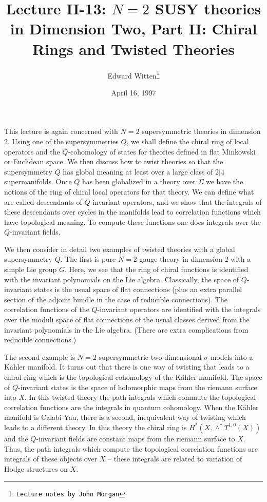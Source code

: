 \title{Lecture II-13:  $N=2$ SUSY theories in Dimension Two, Part II:
Chiral Rings and Twisted Theories} 

\author{Edward Witten\thanks{\tt{Lecture notes by John Morgan}}}
\date{April 16, 1997}


\maketitle

This lecture is again concerned with $N=2$ supersymmetric theories in
dimension $2$.
Using one of the  supersymmetries $Q$, we shall define the
chiral ring of local operators and the $Q$-cohomology of states for
theories defined in flat Minkowski or Euclidean space.
We then discuss how to twist theories so that the supersymmetry $Q$
has global meaning at least over  a large class of 
$2|4$ supermanifolds. Once $Q$ has been globalized in a theory over
$\Sigma$ we 
have the notions of the ring of chiral local operators for that
theory.
We  can define what are called descendants of $Q$-invariant operators,
and we show that the integrals of these descendants over cycles in the
manifolds lead to correlation functions which have
topological meaning.
To compute these functions one does integrals over the $Q$-invariant
fields.

We then consider in detail two examples of twisted theories with a
global supersymmetry $Q$. The first is pure $N=2$ gauge theory in
dimension $2$ with a simple Lie group $G$. Here, we see that the
ring of chiral functions is identified with the invariant polynomials
on the Lie algebra.  Classically, the space of
$Q$-invariant states is the usual space of flat connections (plus
an extra parallel section of the adjoint bundle in the case of
reducible connections). The   correlation functions of the $Q$-invariant
operators are
identified with the  integrals over the moduli space of flat connections
 of the usual classes
 derived from the invariant
polynomials in the Lie algebra. (There are extra complications from 
reducible connections.)

The second example is $N=2$ supersymmetric
two-dimensional $\sigma$-models  into a K\"ahler manifold.
It turns out that there is one way of twisting that leads to a chiral
ring which is the topological cohomology of the K\"ahler manifold.
The space of $Q$-invariant states is the space of holomorphic maps
from the riemann surface into $X$. In this twisted theory the
path integrals which commute the topological correlation  functions
are the integrals in quantum cohomology.
When the K\"ahler manifold is Calabi-Yau, there is a second,
inequivalent way of twisting which leads to a different theory.  In this
theory the chiral ring is $H^*(X,\wedge^*T^{1,0}(X))$ and the
$Q$-invariant fields are constant maps from the riemann surface to
$X$.
Thus, the path integrals which compute the topological correlation
functions are integrals of these objects over $X$ --  these integrals
are related to variation of Hodge structures on $X$.

